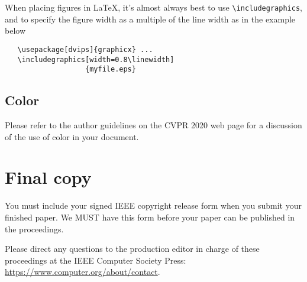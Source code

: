 \documentclass[10pt,twocolumn,a4paper]{article}
\begin{document}
When placing figures in \LaTeX, it's almost always best to use
\verb+\includegraphics+, and to specify the  figure width as a multiple of
the line width as in the example below
{\small\begin{verbatim}
   \usepackage[dvips]{graphicx} ...
   \includegraphics[width=0.8\linewidth]
                   {myfile.eps}
\end{verbatim}
}


\subsection{Color}

Please refer to the author guidelines on the CVPR 2020 web page for a discussion
of the use of color in your document.

\section{Final copy}

You must include your signed IEEE copyright release form when you submit
your finished paper. We MUST have this form before your paper can be
published in the proceedings.

Please direct any questions to the production editor in charge of these 
proceedings at the IEEE Computer Society Press: 
\url{https://www.computer.org/about/contact}. 


{\small


}
\end{document}
